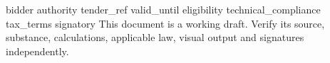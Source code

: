 \documentclass[11pt,a4paper]{article}
\begin{document}
{{bidder}}
{{authority}}
{{tender_ref}}
{{valid_until}}
{{eligibility}}
{{technical_compliance}}
{{tax_terms}}
{{signatory}}
This document is a working draft. Verify its source, substance, calculations, applicable law, visual output and signatures independently.
\end{document}

